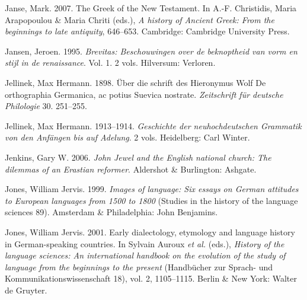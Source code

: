 \begin{styleStandard}
Janse, Mark. 2007. The Greek of the New Testament. In A.-F. Christidis, Maria Arapopoulou \& Maria Chriti (eds.), \textit{A history of Ancient Greek: From the beginnings to late antiquity}, 646–653. Cambridge: Cambridge University Press.
\end{styleStandard}

\begin{styleStandard}
Jansen, Jeroen. 1995. \textit{Brevitas: Beschouwingen over de beknoptheid van vorm en stijl in de renaissance}. Vol. 1. 2 vols. Hilversum: Verloren.
\end{styleStandard}

\begin{styleStandard}
Jellinek, Max Hermann. 1898. Über die schrift des Hieronymus Wolf De orthographia Germanica, ac potius Suevica nostrate. \textit{Zeitschrift für deutsche Philologie} 30. 251–255.
\end{styleStandard}

\begin{styleStandard}
Jellinek, Max Hermann. 1913–1914. \textit{Geschichte der neuhochdeutschen Grammatik von den Anfängen bis auf Adelung}. 2 vols. Heidelberg: Carl Winter.
\end{styleStandard}

\begin{styleStandard}
Jenkins, Gary W. 2006. \textit{John Jewel and the English national church: The dilemmas of an Erastian reformer}. Aldershot \& Burlington: Ashgate.
\end{styleStandard}

\begin{styleStandard}
Jones, William Jervis. 1999. \textit{Images of language: Six essays on German attitudes to European languages from 1500 to 1800} (Studies in the history of the language sciences 89). Amsterdam \& Philadelphia: John Benjamins.
\end{styleStandard}

\begin{styleStandard}
Jones, William Jervis. 2001. Early dialectology, etymology and language history in German-speaking countries. In Sylvain Auroux \textit{et al.} (eds.), \textit{History of the language sciences: An international handbook on the evolution of the study of language from the beginnings to the present} (Handbücher zur Sprach- und Kommunikationswissenschaft 18), vol. 2, 1105–1115. Berlin \& New York: Walter de Gruyter.
\end{styleStandard}

